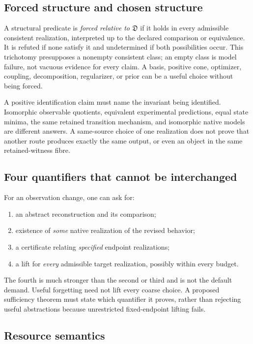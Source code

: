 \documentclass[11pt]{article}
\theoremstyle{remark}
\begin{document}
\subsection{Forced structure and chosen structure}

A structural predicate is \emph{forced relative to $\mathfrak D$} if it holds in every admissible consistent realization, interpreted up to the declared comparison or equivalence. It is refuted if none satisfy it and undetermined if both possibilities occur. This trichotomy presupposes a nonempty consistent class; an empty class is model failure, not vacuous evidence for every claim. A basis, positive cone, optimizer, coupling, decomposition, regularizer, or prior can be a useful choice without being forced.

A positive identification claim must name the invariant being identified. Isomorphic observable quotients, equivalent experimental predictions, equal state minima, the same retained transition mechanism, and isomorphic native models are different answers. A same-source choice of one realization does not prove that another route produces exactly the same output, or even an object in the same retained-witness fibre.

\subsection{Four quantifiers that cannot be interchanged}

For an observation change, one can ask for:
\begin{enumerate}
\item an abstract reconstruction and its comparison;
\item existence of \emph{some} native realization of the revised behavior;
\item a certificate relating \emph{specified} endpoint realizations;
\item a lift for \emph{every} admissible target realization, possibly within every budget.
\end{enumerate}
The fourth is much stronger than the second or third and is not the default demand. Useful forgetting need not lift every coarse choice. A proposed sufficiency theorem must state which quantifier it proves, rather than rejecting useful abstractions because unrestricted fixed-endpoint lifting fails.

\subsection{Resource semantics}
\end{document}
